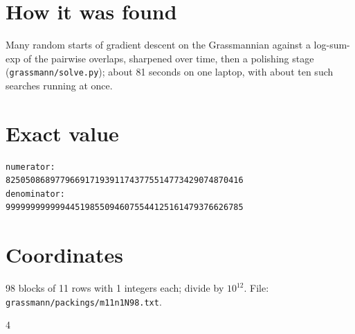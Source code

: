 \documentclass[11pt,a4paper]{article}
\begin{document}
\section{How it was found}
Many random starts of gradient descent on the Grassmannian against a log-sum-exp of the pairwise overlaps, sharpened over time, then a polishing stage (\texttt{grassmann/solve.py}); about 81 seconds on one laptop, with about ten such searches running at once.


\appendix
\section{Exact value}
{\small
\begin{verbatim}
numerator:
825050868977966917193911743775514773429074870416
denominator:
999999999999445198550946075544125161479376626785
\end{verbatim}}

\section{Coordinates}
98 blocks of 11 rows with 1 integers each; divide by $10^{12}$. File: \texttt{grassmann/packings/m11n1N98.txt}.
{\tiny
\begin{multicols}{4}
\end{multicols}}
\end{document}
